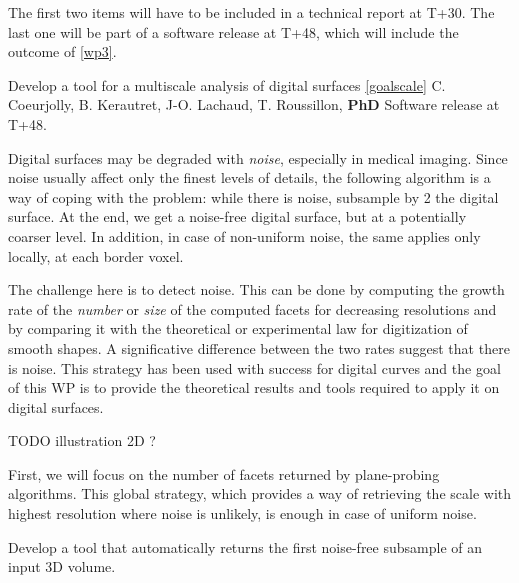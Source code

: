 The first two items will have to be included in a technical report at T+30.
The last one will be part of a software release at T+48, which will include
the outcome of \ref{wp3}. 

  

\medskip
{}
   {Develop a tool for a multiscale analysis of digital surfaces \ref{goalscale}}
   {C. Coeurjolly, B. Kerautret, J-O. Lachaud, T. Roussillon, \textbf{PhD}}
   {Software release at T+48.}
\medskip

Digital surfaces may be degraded with \emph{noise}, especially in medical imaging.
Since noise usually affect only the finest levels of details, the following algorithm
is a way of coping with the problem: while there is noise, subsample by 2 the digital surface.
At the end, we get a noise-free digital surface, but at a potentially coarser level.
In addition, in case of non-uniform noise, the same applies only locally, \ie at each border voxel.  

The challenge here is to detect noise. This can be done by computing the growth rate of the
\emph{number} or \emph{size} of the computed facets for decreasing resolutions
and by comparing it with the theoretical or experimental law for digitization of smooth shapes.
A significative difference between the two rates suggest that there is noise.
This strategy has been used with success for digital curves \cite{Kerautret2012}
and the goal of this WP is to provide the theoretical results and tools required to apply it on digital surfaces. 

TODO illustration 2D ?

First, we will focus on the number of facets returned by plane-probing algorithms.
This global strategy, which provides a way of retrieving the scale with highest resolution
where noise is unlikely, is enough in case of uniform noise. 

\begin{Task}
  \label{task:global}
  Develop a tool that automatically returns the first noise-free subsample of an input 3D volume.
\end{Task}

